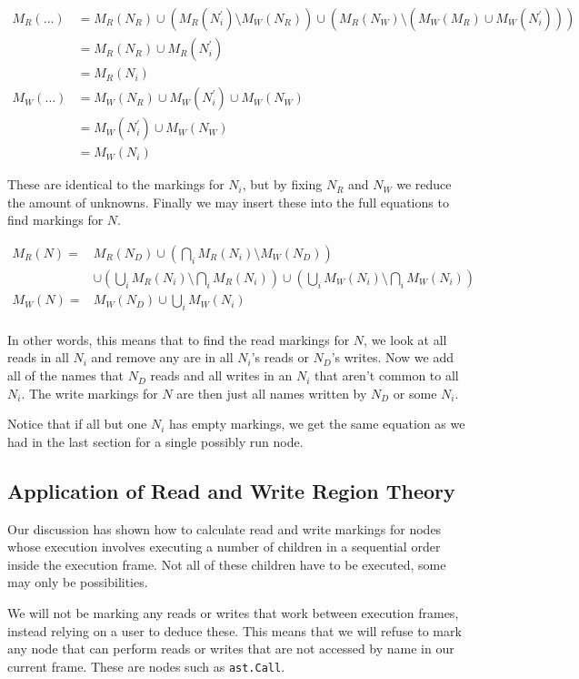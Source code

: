 \documentclass[twoside,a4paper]{report}
\begin{document}
\begin{align*}
M_R(\ldots) &= M_R(N_R) \cup (M_R(N_i^\prime) \setminus M_W(N_R)) \cup (M_R(N_W) \setminus (M_W(M_R) \cup M_W(N_i^\prime))) \\
            &= M_R(N_R) \cup M_R(N_i^\prime) \\
            &= M_R(N_i) \\
M_W(\ldots) &= M_W(N_R) \cup M_W(N_i^\prime) \cup M_W(N_W) \\
            &= M_W(N_i^\prime) \cup M_W(N_W) \\
            &= M_W(N_i)
\end{align*}

These are identical to the markings for $N_i$, but by fixing $N_R$ and $N_W$ we reduce the amount of unknowns. Finally we may insert these into
the full equations to find markings for $N$.

\begin{align*}
M_R(N) =& M_R(N_D) \cup (\bigcap_i M_R(N_i) \setminus M_W(N_D)) \\
        & \cup (\bigcup_i M_R(N_i) \setminus \bigcap_i M_R(N_i)) \cup (\bigcup_i M_W(N_i) \setminus \bigcap_i M_W(N_i)) \\
M_W(N) =& M_W(N_D) \cup \bigcup_i M_W(N_i)\\
\end{align*}

In other words, this means that to find the read markings for $N$, we look at all reads in all $N_i$ and remove any are in all $N_i$'s reads or $N_D$'s writes.
Now we add all of the names that $N_D$ reads and all writes in an $N_i$ that aren't common to all $N_i$. The write markings for $N$ are then just all names
written by $N_D$ or some $N_i$.

Notice that if all but one $N_i$ has empty markings, we get the same equation as we had in the last section for a single possibly run node.

\subsection{Application of Read and Write Region Theory}

Our discussion has shown how to calculate read and write markings for nodes whose execution involves executing a number of children in a sequential order inside
the execution frame. Not all of these children have to be executed, some may only be possibilities.

We will not be marking any reads or writes that work between execution frames, instead relying on a user to deduce these. This means that we will refuse to mark
any node that can perform reads or writes that are not accessed by name in our current frame. These are nodes such as \texttt{ast.Call}.
\end{document}
